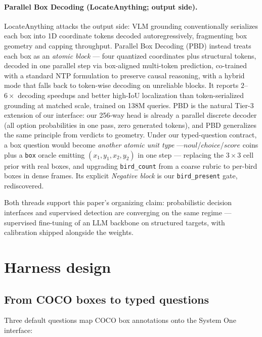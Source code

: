 \documentclass[11pt]{article}
\newcommand{\code}[1]{\texttt{#1}}
\newcommand{\sone}{System One}
\begin{document}
\paragraph{Parallel Box Decoding (LocateAnything; output side).}
LocateAnything \cite{locateanything2026} attacks the output side: VLM
grounding conventionally serializes each box into 1D coordinate tokens
decoded autoregressively, fragmenting box geometry and capping throughput.
Parallel Box Decoding (PBD) instead treats each box as an \emph{atomic
block} --- four quantized coordinates plus structural tokens, decoded in one
parallel step via box-aligned multi-token prediction, co-trained with a
standard NTP formulation to preserve causal reasoning, with a
hybrid mode that falls back to token-wise decoding on unreliable blocks. It
reports $2$--$6\times$ decoding speedups and better high-IoU localization
than token-serialized grounding at matched scale, trained on 138M queries.
PBD is the natural Tier-3 extension of our interface: our 256-way head is
already a parallel discrete decoder (all option probabilities in one pass,
zero generated tokens), and PBD generalizes the same principle from verdicts
to geometry. Under our typed-question contract, a box question would become
\emph{another atomic unit type} ---$noul$/$choice$/$score$ coins plus a
\code{box} oracle emitting $(x_1,y_1,x_2,y_2)$ in one step --- replacing the
$3\times3$ cell prior with real boxes, and upgrading \code{bird\_count} from
a coarse rubric to per-bird boxes in dense frames. Its explicit
\emph{Negative block} is our \code{bird\_present} gate, rediscovered.

Both threads support this paper's organizing claim: probabilistic decision
interfaces and supervised detection are converging on the same regime ---
supervised fine-tuning of an LLM backbone on structured targets, with
calibration shipped alongside the weights.

\section{Harness design}
\label{sec:harness}

\subsection{From COCO boxes to typed questions}
\label{sec:questions}

Three default questions map COCO box annotations onto the \sone{} interface:
\end{document}
